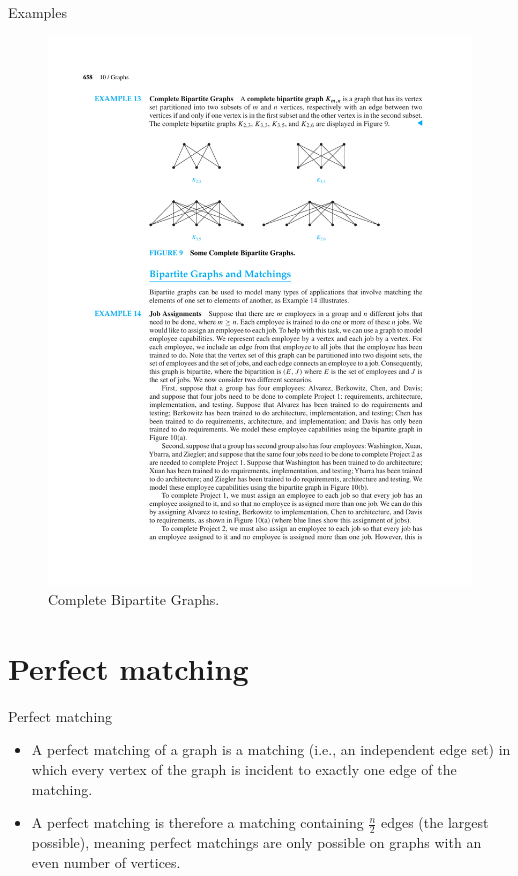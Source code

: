 \documentclass{beamer}
\theoremstyle{definition}
\begin{document}
\begin{frame}{Examples}
    \begin{figure}
        \includegraphics[trim={4.5cm 17.5cm 4.5cm 5cm}, clip, width=1\linewidth]{p658}
        \caption{Complete Bipartite Graphs.}
    \end{figure}
\end{frame}

\section{Perfect matching}

\begin{frame}{Perfect matching}
    \begin{itemize}
        \item A perfect matching of a graph is a matching (i.e., an independent edge set) in which every vertex of the graph is incident to exactly one edge of the matching.
        \item A perfect matching is therefore a matching containing $\frac{n}{2}$ edges (the largest possible), meaning perfect matchings are only possible on graphs with an even number of vertices.
    \end{itemize}
\end{frame}
\end{document}
